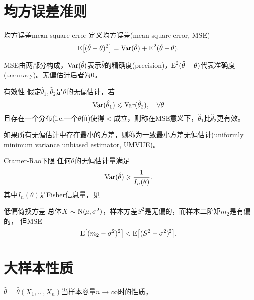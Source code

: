 \section{均方误差准则}
\begin{definition}{均方误差}{mean square error}
	定义均方误差(mean square error, MSE)
	\begin{align}
		\operatorname{E}\bigl[(\hat\theta-\theta)^2\bigr]=\operatorname{Var}(\hat\theta)+\operatorname{E}^2(\hat\theta-\theta).
	\end{align}
\end{definition}
MSE由两部分构成，$\operatorname{Var}(\hat\theta)$表示$\hat\theta$的精确度(precision)，$\operatorname{E}^2(\hat\theta-\theta)$代表准确度(accuracy)。无偏估计后者为0。
\begin{definition}{有效性}{}
	假定$\hat\theta_1,\hat\theta_2$是$\theta$的无偏估计，若
	\[
		\operatorname{Var}(\hat\theta_1)\leqslant\operatorname{Var}(\hat\theta_2),\quad\forall\theta
	\]
	且存在一个分布(i.e.一个$\theta$值)使得$<$成立，则称在MSE意义下，$\hat\theta_1$比$\hat\theta_2$更有效。
\end{definition}
如果所有无偏估计中存在最小的方差，则称为一致最小方差无偏估计(uniformly minimum variance unbiased estimator, UMVUE)。
\begin{theorem}{Cramer-Rao下限}{}
	任何$\theta$的无偏估计量满足
	\begin{align}
		\operatorname{Var}(\hat\theta)\geqslant\frac1{I_n(\theta)}.
	\end{align}
	其中$I_n(\theta)$是Fisher信息量，见
\end{theorem}
\begin{example}{低偏倚换方差}{}
	总体$X\sim\operatorname{N}(\mu,\sigma^2)$，样本方差$S^2$是无偏的，而样本二阶矩$m_2$是有偏的，
	但MSE
	\[
		\operatorname{E}\bigl[(m_2-\sigma^2)^2\bigr]<\operatorname{E}\bigl[(S^2-\sigma^2)^2\bigr].
	\]
\end{example}
\section{大样本性质}
$\hat\theta=\hat\theta(X_1,\ldots,X_n)$当样本容量$n\to\infty$时的性质，

